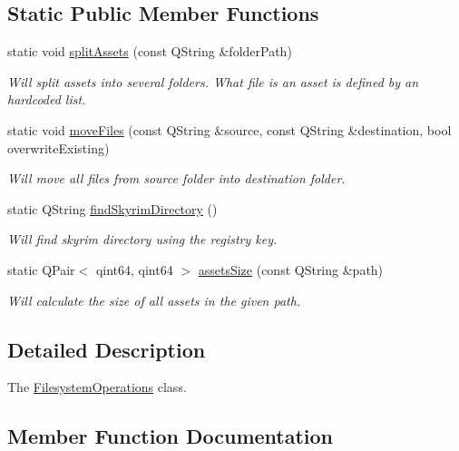 \subsection*{Static Public Member Functions}
\begin{DoxyCompactItemize}
\item 
static void \mbox{\hyperlink{class_filesystem_operations_aa74d95254b105a5f511b9cab168b543a}{split\+Assets}} (const Q\+String \&folder\+Path)
\begin{DoxyCompactList}\small\item\em Will split assets into several folders. What file is an asset is defined by an hardcoded list. \end{DoxyCompactList}\item 
static void \mbox{\hyperlink{class_filesystem_operations_a25865348225a485bdcce684801118533}{move\+Files}} (const Q\+String \&source, const Q\+String \&destination, bool overwrite\+Existing)
\begin{DoxyCompactList}\small\item\em Will move all files from source folder into destination folder. \end{DoxyCompactList}\item 
static Q\+String \mbox{\hyperlink{class_filesystem_operations_a8752f3f1a2021546b8b46929316ebe0f}{find\+Skyrim\+Directory}} ()
\begin{DoxyCompactList}\small\item\em Will find skyrim directory using the registry key. \end{DoxyCompactList}\item 
static Q\+Pair$<$ qint64, qint64 $>$ \mbox{\hyperlink{class_filesystem_operations_ad5836d29c7bbc9941173d20f6ddf44b0}{assets\+Size}} (const Q\+String \&path)
\begin{DoxyCompactList}\small\item\em Will calculate the size of all assets in the given path. \end{DoxyCompactList}\end{DoxyCompactItemize}


\subsection{Detailed Description}
The \mbox{\hyperlink{class_filesystem_operations}{Filesystem\+Operations}} class. 

\subsection{Member Function Documentation}
\mbox{\label{class_filesystem_operations_ad5836d29c7bbc9941173d20f6ddf44b0}} 

